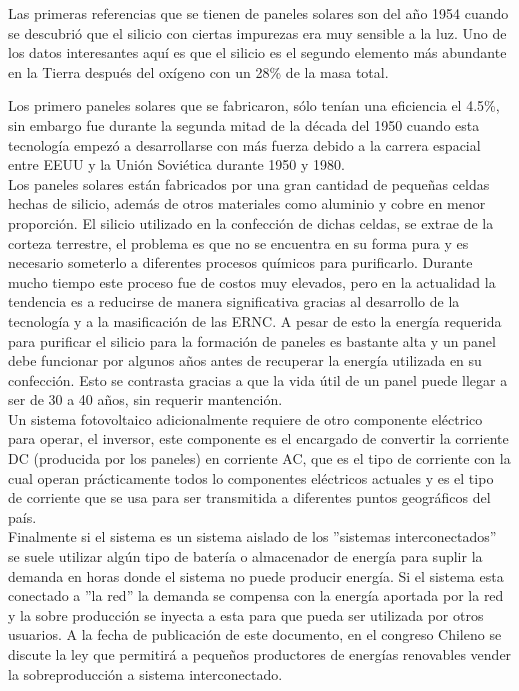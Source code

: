 Las primeras referencias que se tienen de paneles solares son del año 1954 cuando se descubrió que el silicio con ciertas impurezas era muy sensible a la luz. Uno de los datos interesantes aquí es que el silicio es el segundo elemento más abundante en la Tierra después del oxígeno con un 28\% de la masa total.

Los primero paneles solares que se fabricaron, sólo tenían una eficiencia el 4.5\%, sin embargo fue durante la segunda mitad de la década del 1950 cuando esta tecnología empezó a desarrollarse con más fuerza debido a la carrera espacial entre EEUU y la Unión Soviética durante 1950 y 1980.\\

Los paneles solares están fabricados por una gran cantidad de pequeñas celdas hechas de silicio, además de otros materiales como aluminio y cobre en menor proporción. El silicio utilizado en la confección de dichas celdas, se extrae de la corteza terrestre, el problema es que no se encuentra en su forma pura y es necesario someterlo a diferentes procesos químicos para purificarlo. Durante mucho tiempo este proceso fue de costos muy elevados, pero en la actualidad la tendencia es a reducirse de manera significativa gracias al desarrollo de la tecnología y a la masificación de las ERNC. A pesar de esto la energía requerida para purificar el silicio para la formación de paneles es bastante alta y un panel debe funcionar por algunos años antes de recuperar la energía utilizada en su confección. Esto se contrasta gracias a que la vida útil de un panel puede llegar a ser de 30 a 40 años, sin requerir mantención.\\

Un sistema fotovoltaico adicionalmente requiere de otro componente eléctrico para operar, el inversor, este componente es el encargado de convertir la corriente DC (producida por los paneles) en corriente AC, que es el tipo de corriente con la cual operan prácticamente todos lo componentes eléctricos actuales y es el tipo de corriente que se usa para ser transmitida a diferentes puntos geográficos del país.\\

Finalmente si el sistema es un sistema aislado de los ''sistemas interconectados'' se suele utilizar algún tipo de batería o almacenador de energía para suplir la demanda en horas donde el sistema no puede producir energía. Si el sistema esta conectado a ''la red'' la demanda se compensa con la energía aportada por la red y la sobre producción se inyecta a esta para que pueda ser utilizada por otros usuarios. A la fecha de publicación de este documento, en el congreso Chileno se discute la ley que permitirá a pequeños productores de energías renovables vender la sobreproducción a sistema interconectado.

